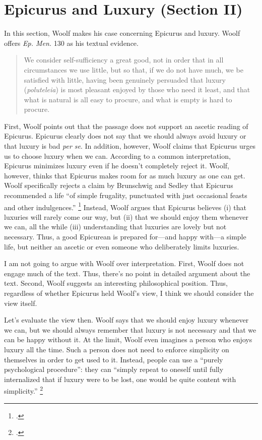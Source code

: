 \documentclass[12pt,letterpaper]{article}
\begin{document}
\section*{Epicurus and Luxury (Section II)}

In this section, Woolf makes his case concerning Epicurus and luxury.
Woolf offers \textit{Ep. Men.} 130 as his textual evidence.

\begin{quote}
    We consider self-sufficiency a great good, not in order that in all circumstances we use little, but so that, if we do not have much, we be satisfied with little, having been genuinely persuaded that luxury (\textit{poluteleia}) is most pleasant enjoyed by those who need it least, and that what is natural is all easy to procure, and what is empty is hard to procure.
\end{quote}

First, Woolf points out that the passage does not support an ascetic reading of Epicurus.
Epicurus clearly does not say that we should always avoid luxury or that luxury is bad \textit{per se}.
In addition, however, Woolf claims that Epicurus urges us to choose luxury when we can.
According to a common interpretation, Epicurus minimizes luxury even if he doesn't completely reject it.
Woolf, however, thinks that Epicurus makes room for as much luxury as one can get.
Woolf specifically rejects a claim by Brunschwig and Sedley that Epicurus recommended a life ``of simple frugality, punctuated with just occasional feasts and other indulgences.''%
\footcite[][161]{hellenistic-philosophy-brunschwig-sedley-2003}
Instead, Woolf argues that Epicurus believes (i) that luxuries will rarely come our way, but (ii) that we should enjoy them whenever we can, all the while (iii) understanding that luxuries are lovely but not necessary.
Thus, a good Epicurean is prepared for---and happy with---a simple life, but neither an ascetic or even someone who deliberately limits luxuries.

I am not going to argue with Woolf over interpretation.
First, Woolf does not engage much of the text.
Thus, there's no point in detailed argument about the text.
Second, Woolf suggests an interesting philosophical position.
Thus, regardless of whether Epicurus held Woolf's view, I think we should consider the view itself.

Let's evaluate the view then.
Woolf says that we should enjoy luxury whenever we can, but we should always remember that luxury is not necessary and that we can be happy without it.
At the limit, Woolf even imagines a person who enjoys luxury all the time.
Such a person does not need to enforce simplicity on themselves in order to get used to it.
Instead, people can use a ``purely psychological procedure'': they can ``simply repeat to oneself until fully internalized that if luxury were to be lost, one would be quite content with simplicity.''%
\footcite[][164]{pleasure-and-desire-woolf-2009}
\end{document}
